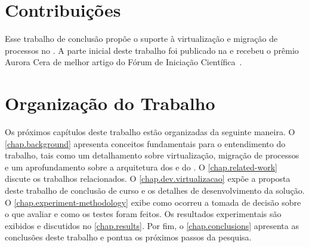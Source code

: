 \section{Contribuições}
Esse trabalho de conclusão propõe o suporte à virtualização e migração de processos no \nanvix. A parte inicial deste trabalho foi publicado na \erad e recebeu o prêmio Aurora Cera de melhor artigo do Fórum de Iniciação Científica~\cite{vanz2022virtualizaccao}.

\section{Organização do Trabalho}
\label{sec.organization}

Os próximos capítulos deste trabalho estão organizadas da seguinte maneira. O \autoref{chap.background} apresenta conceitos fundamentais para o entendimento do trabalho, tais como um detalhamento sobre virtualização, migração de processos e um aprofundamento sobre a arquitetura dos \lws e do \nanvix. O \autoref{chap.related-work} discute os trabalhos relacionados. O \autoref{chap.dev.virtualizacao} expõe a proposta deste trabalho de conclusão de curso e os detalhes de desenvolvimento da solução. O \autoref{chap.experiment-methodology} exibe como ocorreu a tomada de decisão sobre o que avaliar e como os testes foram feitos. Os resultados experimentais são exibidos e discutidos no \autoref{chap.results}. Por fim, o \autoref{chap.conclusions} apresenta as conclusões deste trabalho e pontua os próximos passos da pesquisa.
